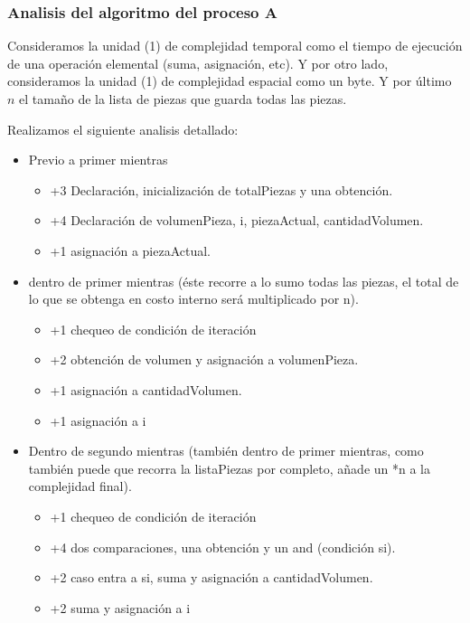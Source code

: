 \documentclass{article}
\begin{document}
\subsubsection{Analisis del algoritmo del proceso A}

Consideramos la unidad (1) de complejidad temporal como el tiempo de ejecución de una operación elemental (suma, asignación, etc). 
Y por otro lado, consideramos la unidad (1) de complejidad espacial como un byte. Y por último \(n\) el tamaño de la lista de piezas que guarda todas las piezas.

Realizamos el siguiente analisis detallado:

\begin{itemize}
    \item Previo a primer mientras
    \begin{itemize}
        \item +3 Declaración, inicialización de totalPiezas y una obtención.
        \item +4 Declaración de volumenPieza, i, piezaActual, cantidadVolumen.
        \item +1 asignación a piezaActual.
    \end{itemize}
    \item dentro de primer mientras (éste recorre a lo sumo todas las piezas, el total de lo que se obtenga en costo interno será multiplicado por n).
    \begin{itemize}
        \item +1 chequeo de condición de iteración
        \item +2 obtención de volumen y asignación a volumenPieza.
        \item +1 asignación a cantidadVolumen.
        \item +1 asignación a i
    \end{itemize}
    \item Dentro de segundo mientras (también dentro de primer mientras, como también puede que recorra la listaPiezas por completo, añade un *n a la complejidad final).
    \begin{itemize}
        \item +1 chequeo de condición de iteración
        \item +4 dos comparaciones, una obtención y un and (condición si).
        \item +2 caso entra a si, suma y asignación a cantidadVolumen.
        \item +2 suma y asignación a i        
    \end{itemize}

\end{itemize}
\end{document}
